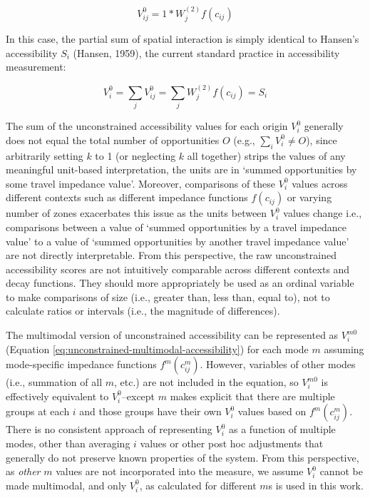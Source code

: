 \documentclass[
11pt, %
oneside, %
english, %
singlespacing, %
]{macthesis} %
\begin{document}
\begin{equation}
\label{eq:unconstrained-access}
V^0_{ij} = 1 *W_j^{(2)} f(c_{ij})
\end{equation} 

In this case, the partial sum of spatial interaction is simply identical to Hansen's accessibility \(S_i\) (Hansen, 1959), the current standard practice in accessibility measurement:

\begin{equation}
\label{eq:unconstrained-accessibility}
V^0_i = \sum_j V^0_{ij} = \sum_j W^{(2)}_jf(c_{ij}) = S_i
\end{equation} 

The sum of the unconstrained accessibility values for each origin \(V^0_{i}\) generally does not equal the total number of opportunities \(O\) (e.g., \(\sum_i V^0_{i} \not= O\)), since arbitrarily setting \(k\) to 1 (or neglecting \(k\) all together) strips the values of any meaningful unit-based interpretation, the units are in `summed opportunities by some travel impedance value'. Moreover, comparisons of these \(V^0_{i}\) values across different contexts such as different impedance functions \(f(c_{ij})\) or varying number of zones exacerbates this issue as the units between \(V^0_{i}\) values change i.e., comparisons between a value of `summed opportunities by a travel impedance value' to a value of `summed opportunities by another travel impedance value' are not directly interpretable. From this perspective, the raw unconstrained accessibility scores are not intuitively comparable across different contexts and decay functions. They should more appropriately be used as an ordinal variable to make comparisons of size (i.e., greater than, less than, equal to), not to calculate ratios or intervals (i.e., the magnitude of differences).

The multimodal version of unconstrained accessibility can be represented as \(V^{m0}_{i}\) (Equation \ref{eq:unconstrained-multimodal-accessibility}) for each mode \(m\) assuming mode-specific impedance functions \(f^m(c^m_{ij})\). However, variables of other modes (i.e., summation of all \(m\), etc.) are not included in the equation, so \(V^{m0}_{i}\) is effectively equivalent to \(V^0_{i}\)--except \(m\) makes explicit that there are multiple groups at each \(i\) and those groups have their own \(V^0_i\) values based on \(f^m(c^m_{ij})\). There is no consistent approach of representing \(V^0_{i}\) as a function of multiple modes, other than averaging \(i\) values or other post hoc adjustments that generally do not preserve known properties of the system. From this perspective, as \emph{other} \(m\) values are not incorporated into the measure, we assume \(V^0_{i}\) cannot be made multimodal, and only \(V^0_{i}\), as calculated for different \(m\)s is used in this work.
\end{document}
